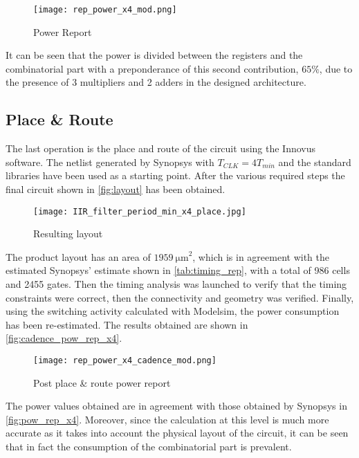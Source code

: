 \begin{figure}[htb!]
	\center
	\texttt{[image: rep\_power\_x4\_mod.png]}
	\caption{Power Report}
	\label{fig:pow_rep_x4}
\end{figure}

It can be seen that the power is divided between the registers and the combinatorial part with a preponderance of this second contribution, $65\%$, due to the presence of 3 multipliers and 2 adders in the designed architecture.

\subsection{Place \& Route}
The last operation is the place and route of the circuit using the Innovus software. The netlist generated by Synopsys with $T_{CLK} = 4 T_{min}$ and the standard libraries have been used as a starting point. After the various required steps the final circuit shown in \autoref{fig:layout} has been obtained.

\begin{figure}[htb!]
	\center
	\texttt{[image: IIR\_filter\_period\_min\_x4\_place.jpg]}
	\caption{Resulting layout}
	\label{fig:layout}
\end{figure}

The product layout has an area of $\SI{1959}{\micro\meter}^2$, which is in agreement with the estimated Synopsys' estimate shown in \autoref{tab:timing_rep}, with a total of 986 cells and 2455 gates. Then the timing analysis was launched to verify that the timing constraints were correct, then the connectivity and geometry was verified. Finally, using the switching activity calculated with Modelsim, the power consumption has been re-estimated. The results obtained are shown in \autoref{fig:cadence_pow_rep_x4}.

\begin{figure}[htb]
	\center
	\texttt{[image: rep\_power\_x4\_cadence\_mod.png]}
	\caption{Post place \& route power report}
	\label{fig:cadence_pow_rep_x4}
\end{figure}

The power values obtained are in agreement with those obtained by Synopsys in \autoref{fig:pow_rep_x4}. Moreover, since the calculation at this level is much more accurate as it takes into account the physical layout of the circuit, it can be seen that in fact the consumption of the combinatorial part is prevalent.
